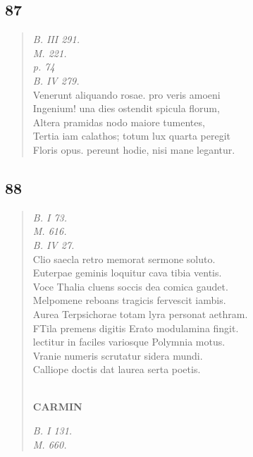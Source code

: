 \documentclass[11pt, a4paper]{report}
\begin{document}
            \subsection*{87}
      \begin{verse}
      \textit{B. III 291.} \\ \textit{M. 221.} \\ \textit{p. 74} \\ \textit{B. IV 279.} \\ Venerunt aliquando rosae. pro veris amoeni \\ Ingenium! una dies ostendit spicula florum, \\ Altera pramidas nodo maiore tumentes, \\ Tertia iam calathos; totum lux quarta peregit \\ Floris opus. pereunt hodie, nisi mane legantur. \\ 
      \end{verse}
  
            \subsection*{88}
      \begin{verse}
      \textit{B. I 73.} \\ \textit{M. 616.} \\ \textit{B. IV 27.} \\ Clio saecla retro memorat sermone soluto. \\ Euterpae geminis loquitur cava tibia ventis. \\ Voce Thalia cluens soccis dea comica gaudet. \\ Melpomene reboans tragicis fervescit iambis. \\ Aurea Terpsichorae totam lyra personat aethram. \\ FTila premens digitis Erato modulamina fingit. \\ lectitur in faciles variosque Polymnia motus. \\ Vranie numeris scrutatur sidera mundi. \\ Calliope doctis dat laurea serta poetis. \\ 
        ﻿\pagebreak 
    \begin{center} \textbf{CARMIN} \end{center} \marginpar{[100]} \textit{B. I 131.} \\ \textit{M. 660.} \\ 
      \end{verse}
  
\end{document}
